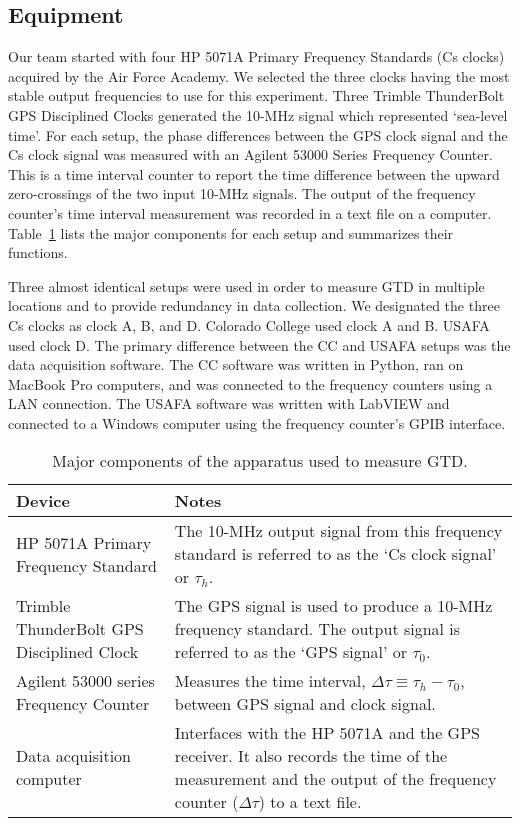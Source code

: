 \documentclass[prb,preprint]{revtex4-1}
\begin{document}
\subsection{Equipment}
\label{sec:equipment}
Our team started with four HP 5071A Primary Frequency Standards (Cs clocks) acquired by the Air Force Academy. We selected the three clocks having the most stable output frequencies to use for this experiment. Three Trimble ThunderBolt GPS Disciplined Clocks generated the 10-MHz signal which represented `sea-level time'. 
For each setup, the phase differences between the GPS clock signal and the Cs clock signal was measured with an Agilent 53000 Series Frequency Counter. This is a time interval counter to report the time difference between the upward zero-crossings of the two input 10-MHz signals.  The output of the frequency counter's time interval measurement was recorded in a text file on a computer. Table~\ref{tbl:components} lists the major components for each setup and summarizes their functions.

Three almost identical setups were used in order to measure GTD in multiple locations and to provide redundancy in data collection. We designated the three Cs clocks as clock A, B, and D. Colorado College used clock A and B. USAFA used clock D. The primary difference between the CC and USAFA setups was the data acquisition software. The CC software was written in Python, ran on MacBook Pro computers, and was connected to the frequency counters using a LAN connection. 
The USAFA software was written with LabVIEW and connected to a Windows computer using the frequency counter's GPIB interface.
\begin{table}[ht!]
\centering
\caption{Major components of the apparatus used to measure GTD.}
\begin{ruledtabular}
\begin{tabular}{l p{8cm}}
Device & Notes  \\
\hline	%
HP 5071A Primary Frequency Standard  & The 10-MHz output signal from this frequency 
									   standard is referred to as the `Cs clock signal' 
									   or $\tau_h$.  \\
Trimble ThunderBolt GPS Disciplined Clock  & The GPS signal is used to produce a 10-MHz 
											 frequency standard. The output 
											 signal is referred to as the `GPS signal' 
											 or $\tau_0$.  \\
Agilent 53000 series Frequency Counter  	& Measures the time interval, 
									  $\Delta \tau \equiv \tau_h - \tau_0$, between 
									  GPS signal and clock signal.   \\
Data acquisition computer  			& Interfaces with the HP 5071A and the GPS receiver. It also 
									  records the time of the measurement and the output
									  of the frequency counter ($\Delta \tau$) to a text file.
\end{tabular}
\end{ruledtabular}
\label{tbl:components}
\end{table}
 
\end{document}
